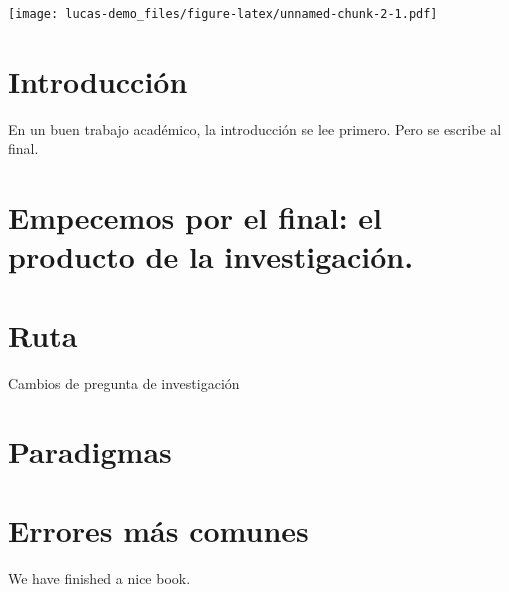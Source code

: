 \documentclass[
]{book}
\begin{document}
\texttt{[image: lucas-demo\_files/figure-latex/unnamed-chunk-2-1.pdf]}

\hypertarget{intro}{%
\chapter{Introducción}\label{intro}}

En un buen trabajo académico, la introducción se lee primero. Pero se escribe al final.

\hypertarget{empecemos-por-el-final-el-producto-de-la-investigaciuxf3n.}{%
\chapter{Empecemos por el final: el producto de la investigación.}\label{empecemos-por-el-final-el-producto-de-la-investigaciuxf3n.}}

\hypertarget{ruta}{%
\chapter{Ruta}\label{ruta}}

Cambios de pregunta de investigación

\hypertarget{paradigmas}{%
\chapter{Paradigmas}\label{paradigmas}}

\hypertarget{errores-muxe1s-comunes}{%
\chapter{Errores más comunes}\label{errores-muxe1s-comunes}}

We have finished a nice book.

  
\end{document}
